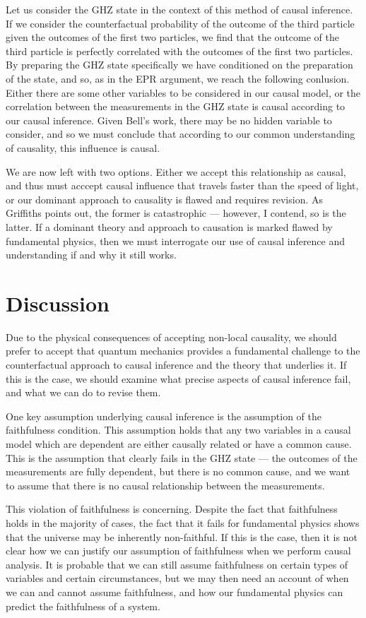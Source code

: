 \documentclass[11pt, a4paper]{article}
\begin{document}
Let us consider the GHZ state in the context of this method of causal inference.
If we consider the counterfactual probability of the outcome of the third
particle given the outcomes of the first two particles, we find that the outcome
of the third particle is perfectly correlated with the outcomes of the first two
particles. By preparing the GHZ state specifically we have conditioned on the 
preparation of the state, and so, as in the EPR argument, we reach the following
conlusion. Either there are some other variables to be considered in our causal
model, or the correlation between the measurements in the GHZ state is causal
according to our causal inference. Given Bell's work, there may be no hidden 
variable to consider, and so we must conclude that according to our common 
understanding of causality, this influence is causal.

We are now left with two options. Either we accept this relationship as causal,
and thus must acccept causal influence that travels faster than the speed of
light, or our dominant approach to causality is flawed and requires revision.
As Griffiths points out, the former is catastrophic — however, I contend, so is
the latter. If a dominant theory and approach to causation is marked flawed by
fundamental physics, then we must interrogate our use of causal inference and 
understanding if and why it still works.

\section{Discussion}

Due to the physical consequences of accepting non-local causality, we should
prefer to accept that quantum mechanics provides a fundamental challenge to the 
counterfactual approach to causal inference and the theory that underlies it.
If this is the case, we should examine what precise aspects of causal inference
fail, and what we can do to revise them.

One key assumption underlying causal inference is the assumption of the
faithfulness condition. This assumption holds that any two variables in a causal
model which are dependent are either causally related or have a common cause.
This is the assumption that clearly fails in the GHZ state — the outcomes of the
measurements are fully dependent, but there is no common cause, and we want to
assume that there is no causal relationship between the measurements.

This violation of faithfulness is concerning. Despite the fact that faithfulness
holds in the majority of cases, the fact that it fails for fundamental physics
shows that the universe may be inherently non-faithful. If this is the case,
then it is not clear how we can justify our assumption of faithfulness when we 
perform causal analysis. It is probable that we can still assume faithfulness 
on certain types of variables and certain circumstances, but we may then need
an account of when we can and cannot assume faithfulness, and how our
fundamental physics can predict the faithfulness of a system.
\end{document}
